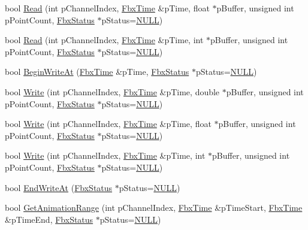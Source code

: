 \begin{DoxyCompactItemize}
\item 
bool \hyperlink{class_fbx_cache_a518383cfd39385e077ffc53be85aa728}{Read} (int p\+Channel\+Index, \hyperlink{class_fbx_time}{Fbx\+Time} \&p\+Time, float $\ast$p\+Buffer, unsigned int p\+Point\+Count, \hyperlink{class_fbx_status}{Fbx\+Status} $\ast$p\+Status=\hyperlink{fbxarch_8h_a070d2ce7b6bb7e5c05602aa8c308d0c4}{N\+U\+LL})
\item 
bool \hyperlink{class_fbx_cache_a513dbb2b726eaf353528c8c6900ec77b}{Read} (int p\+Channel\+Index, \hyperlink{class_fbx_time}{Fbx\+Time} \&p\+Time, int $\ast$p\+Buffer, unsigned int p\+Point\+Count, \hyperlink{class_fbx_status}{Fbx\+Status} $\ast$p\+Status=\hyperlink{fbxarch_8h_a070d2ce7b6bb7e5c05602aa8c308d0c4}{N\+U\+LL})
\item 
bool \hyperlink{class_fbx_cache_ade715322780a6993e218251092f3c5c8}{Begin\+Write\+At} (\hyperlink{class_fbx_time}{Fbx\+Time} \&p\+Time, \hyperlink{class_fbx_status}{Fbx\+Status} $\ast$p\+Status=\hyperlink{fbxarch_8h_a070d2ce7b6bb7e5c05602aa8c308d0c4}{N\+U\+LL})
\item 
bool \hyperlink{class_fbx_cache_a9144c3dfd8441a1e73c759259fe1b9d9}{Write} (int p\+Channel\+Index, \hyperlink{class_fbx_time}{Fbx\+Time} \&p\+Time, double $\ast$p\+Buffer, unsigned int p\+Point\+Count, \hyperlink{class_fbx_status}{Fbx\+Status} $\ast$p\+Status=\hyperlink{fbxarch_8h_a070d2ce7b6bb7e5c05602aa8c308d0c4}{N\+U\+LL})
\item 
bool \hyperlink{class_fbx_cache_a6a8522f9c661337e4a458c67bcf1f659}{Write} (int p\+Channel\+Index, \hyperlink{class_fbx_time}{Fbx\+Time} \&p\+Time, float $\ast$p\+Buffer, unsigned int p\+Point\+Count, \hyperlink{class_fbx_status}{Fbx\+Status} $\ast$p\+Status=\hyperlink{fbxarch_8h_a070d2ce7b6bb7e5c05602aa8c308d0c4}{N\+U\+LL})
\item 
bool \hyperlink{class_fbx_cache_a4d1a6dbd1d65fa381ded138b7edbc219}{Write} (int p\+Channel\+Index, \hyperlink{class_fbx_time}{Fbx\+Time} \&p\+Time, int $\ast$p\+Buffer, unsigned int p\+Point\+Count, \hyperlink{class_fbx_status}{Fbx\+Status} $\ast$p\+Status=\hyperlink{fbxarch_8h_a070d2ce7b6bb7e5c05602aa8c308d0c4}{N\+U\+LL})
\item 
bool \hyperlink{class_fbx_cache_a3df95a880da51b2ad2a957f212d76ba6}{End\+Write\+At} (\hyperlink{class_fbx_status}{Fbx\+Status} $\ast$p\+Status=\hyperlink{fbxarch_8h_a070d2ce7b6bb7e5c05602aa8c308d0c4}{N\+U\+LL})
\item 
bool \hyperlink{class_fbx_cache_a974f809c072c4e71c4ff506259474aed}{Get\+Animation\+Range} (int p\+Channel\+Index, \hyperlink{class_fbx_time}{Fbx\+Time} \&p\+Time\+Start, \hyperlink{class_fbx_time}{Fbx\+Time} \&p\+Time\+End, \hyperlink{class_fbx_status}{Fbx\+Status} $\ast$p\+Status=\hyperlink{fbxarch_8h_a070d2ce7b6bb7e5c05602aa8c308d0c4}{N\+U\+LL})

\end{DoxyCompactItemize}
